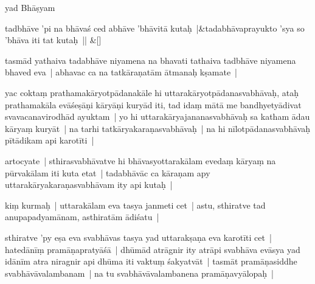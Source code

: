 \documentclass[article,12pt,a4paper]{memoir}%
\newcounter{parCount}
\begin{document}
	  \pstart \leavevmode%
	\label{thakur75-76.25}yad Bhāṣyam
	{}
	\pend%
      
	    
	    \stanza[\smallbreak]
	  tadbhāve 'pi na bhāvaś ced abhāve 'bhāvitā kutaḥ |&tadabhāvaprayukto 'sya so 'bhāva iti tat kutaḥ || \&[\smallbreak]
	  
	  
	  

	  \pstart \leavevmode%
	\label{thakur75-76.28}tasmād yathaiva tadabhāve niyamena na bhavati tathaiva tadbhāve niyamena bhaved eva | abhavac ca na tatkāraṇatām ātmanaḥ kṣamate |
	{}
	\pend%
      

	  \pstart \leavevmode%
	\label{thakur75-77.1}yac coktaṃ prathamakāryotpādanakāle hi uttarakāryotpādanasvabhāvaḥ, ataḥ prathamakāla evāśeṣāṇi kāryāṇi kuryād iti, tad idaṃ mātā me bandhyetyādivat svavacanavirodhād ayuktam | yo hi uttarakāryajananasvabhāvaḥ sa katham ādau kāryaṃ kuryāt | na tarhi tatkāryakaraṇasvabhāvaḥ | na hi nīlotpādanasvabhāvaḥ pītādikam api karotīti |
	{}
	\pend%
      

	  \pstart \leavevmode%
	\label{thakur75-77.6}artocyate | sthirasvabhāvatve hi bhāvasyottarakālam evedaṃ kāryaṃ na pūrvakālam iti kuta etat | tadabhāvāc ca kāraṇam apy uttarakāryakaraṇasvabhāvam ity api kutaḥ | 
	{}
	\pend%
      

	  \pstart \leavevmode%
	\label{thakur75-77.8}kiṃ kurmaḥ | uttarakālam eva tasya janmeti cet | astu, sthiratve tad anupapadyamānam, asthiratām ādiśatu |
	{}
	\pend%
      

	  \pstart \leavevmode%
	\label{thakur75-77.10}sthiratve 'py eṣa eva svabhāvas tasya yad uttarakṣaṇa eva karotīti cet | hatedānīṃ pramāṇapratyāśā | dhūmād atrāgnir ity atrāpi svabhāva evāsya yad idānīm atra niragnir api dhūma iti vaktuṃ śakyatvāt | tasmāt pramāṇasiddhe svabhāvāvalambanam | na tu svabhāvāvalambanena pramāṇavyālopaḥ | 
	{}
	\pend%
      
\end{document}
